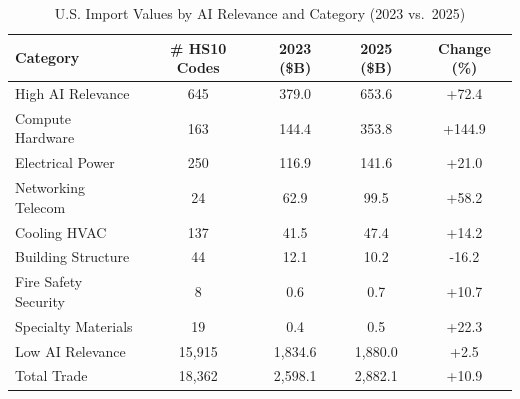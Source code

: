 \begin{table}[htbp]
\centering
\caption{U.S. Import Values by AI Relevance and Category (2023 vs.\ 2025)}
\label{tab:trade_hierarchical}
\setlength{\tabcolsep}{4.5mm}
\renewcommand{\arraystretch}{1.60}
{\small
\begin{tabular}{lcccc}
\toprule
Category & \# HS10 Codes & 2023 (\$B) & 2025 (\$B) & Change (\%) \\
\midrule
High AI Relevance & 645 & 379.0 & 653.6 & +72.4 \\
\quad\quad Compute Hardware & 163 & 144.4 & 353.8 & +144.9 \\
\quad\quad Electrical Power & 250 & 116.9 & 141.6 & +21.0 \\
\quad\quad Networking Telecom & 24 & 62.9 & 99.5 & +58.2 \\
\quad\quad Cooling HVAC & 137 & 41.5 & 47.4 & +14.2 \\
\quad\quad Building Structure & 44 & 12.1 & 10.2 & -16.2 \\
\quad\quad Fire Safety Security & 8 & 0.6 & 0.7 & +10.7 \\
\quad\quad Specialty Materials & 19 & 0.4 & 0.5 & +22.3 \\
Low AI Relevance & 15,915 & 1,834.6 & 1,880.0 & +2.5 \\
\midrule
Total Trade & 18,362 & 2,598.1 & 2,882.1 & +10.9 \\
\bottomrule
\end{tabular}}
\end{table}
